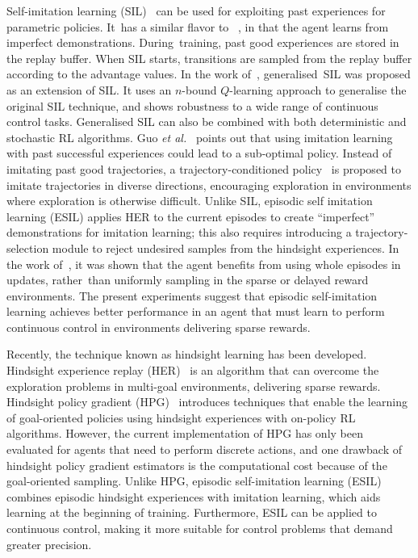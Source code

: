 Self-imitation learning (SIL)~\cite{oh2018self} can be used for exploiting past experiences for parametric policies. It~has a similar flavor to ~\cite{gangwani2018learning, pmlr-v97-wu19a}, in that the agent learns from imperfect demonstrations. During~training, past good experiences are stored in the replay buffer. When SIL starts, transitions are sampled from the replay buffer according to the advantage values. {In the work of~\cite{tang2020self}, generalised~SIL was proposed as an extension of SIL. It uses an $n$-bound $Q$-learning approach to generalise the original SIL technique, and shows robustness to a wide range of continuous control tasks. Generalised SIL can also be combined with both deterministic and stochastic RL algorithms. Guo \textit{et al.}~\cite{guo2019self} points out that using imitation learning with past successful experiences could lead to a sub-optimal policy. Instead of imitating past good trajectories, a trajectory-conditioned policy~\cite{guo2019self} is proposed to imitate trajectories in diverse directions, encouraging exploration in environments where exploration is otherwise difficult.} Unlike SIL, episodic self imitation learning (ESIL) applies HER to the current episodes to create ``imperfect'' demonstrations for imitation learning; this also requires introducing a trajectory-selection module to reject undesired samples from the hindsight experiences. In the work of~\cite{lee2019sample}, it was shown that the agent benefits from using whole episodes in updates, rather~than uniformly sampling in the sparse or delayed reward environments. The present experiments suggest that episodic self-imitation learning {achieves better performance in an agent that must learn to perform continuous control in environments delivering sparse rewards}.

Recently, the technique known as hindsight learning has been developed. Hindsight experience replay (HER)~\cite{andrychowicz2017hindsight} is an algorithm that can overcome the exploration problems in multi-goal environments, delivering sparse rewards. Hindsight policy gradient (HPG)~\cite{rauber2018hindsight} introduces techniques that enable the learning of goal-oriented policies using hindsight experiences with on-policy RL algorithms. However, the current implementation of HPG has only been evaluated for agents that need to perform discrete actions, and one drawback of hindsight policy gradient estimators is the computational cost because of the goal-oriented sampling. Unlike HPG, episodic self-imitation learning (ESIL) combines episodic hindsight experiences with imitation learning, which aids learning at the beginning of training. Furthermore, ESIL can be applied to continuous control, making it more suitable for control problems that demand greater precision.

